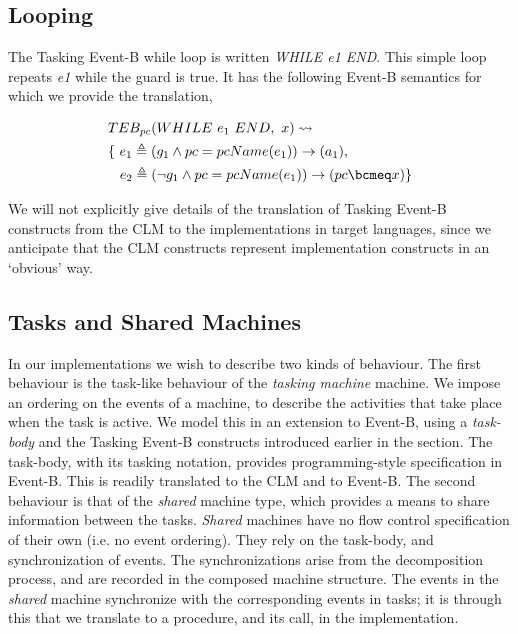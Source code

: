 \subsection{Looping}
The Tasking Event-B while loop is written \emph{WHILE e1 END}. This simple loop repeats \emph{e1} while the guard is true. It has the following Event-B semantics for which we provide the translation,

\begin{equation}
\begin{split}
&TEB_{pc}(WHILE~ e_1~ END,~  x) \leadsto\\
& \{~ e_1 \triangleq (g_1 \land pc = pcName(e_1)) \rightarrow (a_1 ),\\
&\hspace*{0.3cm}e_2 \triangleq (\lnot g_1 \land pc = pcName(e_1)) \rightarrow (pc \bcmeq x) \}
\end{split}
\notag
\end{equation}


We will not explicitly give details of the translation of Tasking Event-B constructs from the CLM to the implementations in target languages, since we anticipate that the CLM constructs represent implementation constructs in an `obvious' way. 

\subsection{Tasks and Shared Machines}\label{tasks}
In our implementations we wish to describe two kinds of behaviour. The first behaviour is the task-like behaviour of the \emph{tasking machine} machine. We impose an ordering on the events of a machine, to describe the activities that take place when the task is active. We model this in an extension to Event-B, using a \emph{task-body} and the Tasking Event-B constructs introduced earlier in the section. The task-body, with its tasking notation, provides programming-style specification in Event-B. This is readily translated to the CLM and to Event-B. The second behaviour is that of the \emph{shared} machine type, which provides a means to share information between the tasks. \emph{Shared} machines have no flow control specification of their own (i.e. no event ordering). They rely on the task-body, and synchronization of events. The synchronizations arise from the decomposition process, and are recorded in the composed machine structure. The events in the \emph{shared} machine synchronize with the corresponding events in tasks; it is through this that we translate to a procedure, and its call, in the implementation. 


